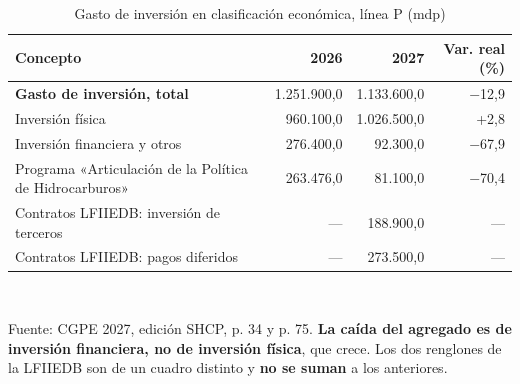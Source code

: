\begin{table}[htbp]\centering\small
\caption{Gasto de inversión en clasificación económica, línea P (mdp)}\label{cua:inv}
\begin{tabular}{lrrr}
\toprule
Concepto & 2026 & 2027 & Var. real (\%) \\
\midrule
\textbf{Gasto de inversión, total} & 1.251.900,0 & 1.133.600,0 & $-$12,9 \\
\quad Inversión física & 960.100,0 & 1.026.500,0 & +2,8 \\
\quad Inversión financiera y otros & 276.400,0 & 92.300,0 & $-$67,9 \\
Programa «Articulación de la Política de Hidrocarburos» & 263.476,0 & 81.100,0 & $-$70,4 \\
Contratos LFIIEDB: inversión de terceros & --- & 188.900,0 & --- \\
Contratos LFIIEDB: pagos diferidos & --- & 273.500,0 & --- \\
\bottomrule
\end{tabular}
\\[2pt]\begin{minipage}{0.92\textwidth}\scriptsize Fuente: CGPE 2027, edición SHCP, p. 34 y p. 75. \textbf{La caída del agregado es de inversión financiera, no de inversión física}, que crece. Los dos renglones de la LFIIEDB son de un cuadro distinto y \textbf{no se suman} a los anteriores.\end{minipage}
\end{table}
